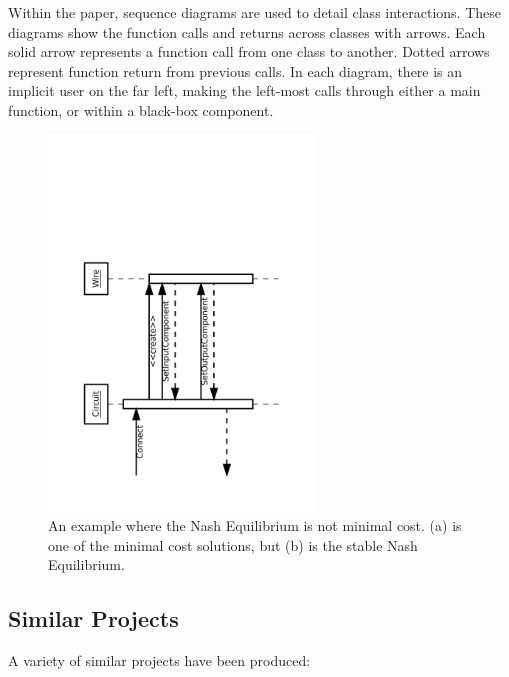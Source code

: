 \documentclass{article}
\begin{document}
Within the paper, sequence diagrams are used to detail class interactions. These diagrams show the function calls and returns across classes with arrows. Each solid arrow represents a function call from one class to another. Dotted arrows represent function return from previous calls. In each diagram, there is an implicit user on the far left, making the left-most calls through either a main function, or within a black-box component.

\begin{figure}[H]
    \begin{center}
        \includegraphics[angle=270,width=200pt]{imgs/ComponentConnectionInteraction.pdf}
    \end{center}
    \caption{An example where the Nash Equilibrium is not minimal cost.
        (a) is one of the minimal cost solutions, but (b) is the stable Nash
        Equilibrium.}
\end{figure}

\subsection{Similar Projects}

A variety of similar projects have been produced:
\end{document}
